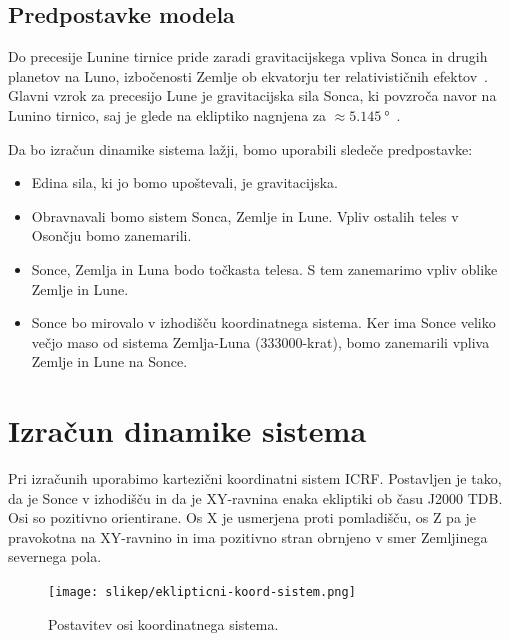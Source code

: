 \documentclass[a4paper,12pt]{article}
\begin{document}
\newpage

\subsection{Predpostavke modela}
Do precesije Lunine tirnice pride zaradi gravitacijskega vpliva Sonca in drugih 
planetov na Luno, izbočenosti Zemlje ob ekvatorju ter relativističnih 
efektov~\cite{apsidal}. Glavni vzrok za precesijo Lune je gravitacijska sila 
Sonca, ki povzroča navor na Lunino tirnico, saj je glede na ekliptiko nagnjena 
za $\approx \SI{5.145}{\degree}$~\cite{nasassd}.

\vspace{1em}
\noindent
Da bo izračun dinamike sistema lažji, bomo uporabili sledeče predpostavke:
\begin{itemize}
    \item Edina sila, ki jo bomo upoštevali, je gravitacijska.
    \item Obravnavali bomo sistem Sonca, Zemlje in Lune. Vpliv ostalih teles 
    v Osončju bomo zanemarili.
    \item Sonce, Zemlja in Luna bodo točkasta telesa. S tem zanemarimo vpliv
    oblike Zemlje in Lune.
    \item Sonce bo mirovalo v izhodišču koordinatnega sistema. Ker ima Sonce 
    veliko večjo maso od sistema Zemlja-Luna \mbox{(\num{333000}-krat)}, 
    bomo zanemarili vpliva Zemlje in Lune na Sonce.
\end{itemize}

\newpage
\section{Izračun dinamike sistema}

\noindent
Pri izračunih uporabimo kartezični koordinatni sistem ICRF. Postavljen 
je tako, da je Sonce v izhodišču in da je XY-ravnina enaka ekliptiki ob času 
J2000 TDB. Osi so pozitivno orientirane. Os X je usmerjena proti pomladišču, 
os Z pa je pravokotna na XY-ravnino in ima pozitivno stran obrnjeno v smer 
Zemljinega severnega pola.

\begin{figure}[ht]
    \centering
    \texttt{[image: slikep/eklipticni-koord-sistem.png]}
    \caption{Postavitev osi koordinatnega sistema.}
\end{figure}
\end{document}
